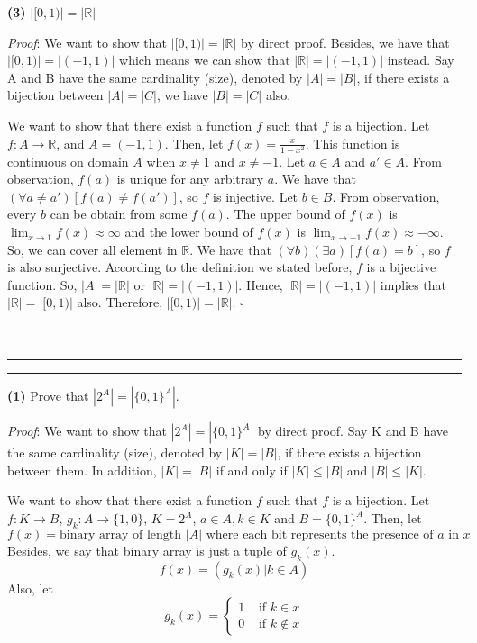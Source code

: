 \documentclass[a4paper, 11pt]{article}
\newcommand{\question}[2] {\vspace{.25in} \hrule\vspace{0.5em}
	\noindent{\bf #1: #2} \vspace{0.5em}
	\hrule \vspace{.10in}}
\renewcommand{\part}[1] {\vspace{.10in} {\bf (#1)}}
\begin{document}
	\part{3} $|[0,1)| = |\mathbb{R}|$

	{\em Proof}: We want to show that $|[0,1)| = |\mathbb{R}|$ by direct proof. Besides, we have that $|[0,1)| = |(-1,1)|$ which means we can show that $|\mathbb{R}| = |(-1,1)|$ instead. Say A and B have the same cardinality (size), denoted by $|A| = |B|$, if there exists a bijection between $|A| = |C|$, we have $|B| = |C|$ also.
	
	We want to show that there exist a function $f$ such that $f$ is a bijection. Let $f: A \rightarrow \mathbb{R}$, and $A = (-1,1)$. Then, let $f(x) = \frac{x}{1-x^2}$. This function is continuous on domain $A$ when $x \neq 1$ and $x \neq -1$. Let $a \in A$ and $a' \in A$. From observation, $f(a)$ is unique for any arbitrary $a$. We have that $ ( \forall a \neq a')[ f(a) \neq f(a')]$, so $f$ is injective. Let $b \in B$. From observation, every $b$ can be obtain from some $f(a)$. The upper bound of $f(x)$ is $\lim_{x \rightarrow 1} f(x) \approx \infty$ and the lower bound of $f(x)$ is $\lim_{x \rightarrow -1} f(x) \approx	 -\infty$. So, we can cover all element in $\mathbb{R}$.
	We have that $ ( \forall b)( \exists a)[ f(a) = b]$, so $f$ is also surjective. According to the definition we stated before, $f$ is a bijective function. So, $|A| = |\mathbb{R}|$ or $|\mathbb{R}| = |(-1,1)|$. Hence, $|\mathbb{R}| = |(-1,1)|$ implies that $|\mathbb{R}| = |[0,1)|$ also. Therefore, $|[0,1)| = |\mathbb{R}|$. $\square$\\\\\\
		
	\question{2}{The Power Set of A } %
	
	\part{1} Prove that $|2^A| = |\{0, 1\}^A|$.
	
	{\em Proof}: %
	We want to show that $|2^A| = |\{0, 1\}^A|$ by direct proof. Say K and B have the same cardinality (size), denoted by $|K| = |B|$, if there exists a bijection between them. In addition, $|K|=|B|$ if and only if $|K| \leq |B|$ and $|B| \leq |K|$. 
	
	We want to show that there exist a function $f$ such that $f$ is a bijection. Let $f:K \rightarrow B$, $g_k:A \rightarrow \{1,0\}$, $K = 2^A$, $a \in A, k \in K$ and $B = \{0, 1\}^A$. Then, let 
	$$f(x) =  \text{binary array of length $|A|$ where each bit represents the presence of $a$ in $x$}$$
	Besides, we say that binary array is just a tuple of $g_k(x)$.
	$$f(x) =  (g_k(x) | k \in A)$$
	Also, let 
	$$g_k(x) = \begin{cases} 
	1 & \text{ if $k \in x$} \\
	0 & \text{ if $k \notin x$}
	\end{cases} $$
	
\end{document}
